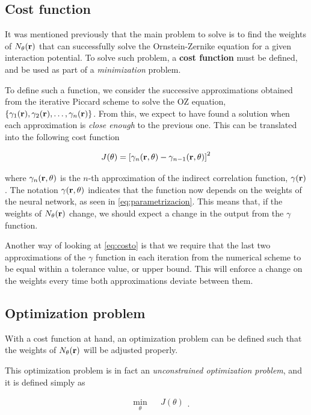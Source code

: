 \subsection{Cost function}
It was mentioned previously that the main problem to solve is to find the weights of
$N_{\theta}(\mathbf{r})$ that can successfully solve the Ornstein-Zernike equation
for a given interaction potential.
To solve such problem, a \textbf{cost function} must be defined, and be used as part of
a \emph{minimization} problem.

To define such a function, we consider the successive approximations obtained from the
iterative Piccard scheme to solve the OZ equation, $\{\gamma_1(\mathbf{r}), \gamma_2(\mathbf{r}), \dots, \gamma_n(\mathbf{r})\}$.
From this, we expect to have found a solution when each approximation
is \emph{close enough} to the previous one. This can be translated into the following
cost function

\begin{equation}
    J(\theta) = \left[\gamma_{n}(\mathbf{r}, \theta) - \gamma_{n-1}(\mathbf{r}, \theta) \right]^2
    \label{eq:costo}
\end{equation}

where $\gamma_{n}(\mathbf{r}, \theta)$ is the $n$-th approximation of the indirect
correlation function, $\gamma(\mathbf{r})$.
The notation $\gamma(\mathbf{r}, \theta)$ indicates that the function now depends
on the weights of the neural network, as seen in \autoref{eq:parametrizacion}.
This means that, if the weights of $N_{\theta}(\mathbf{r})$ change, we should expect a change in the output
from the $\gamma$ function.

Another way of looking at \autoref{eq:costo} is that we require that the last 
two approximations of the $\gamma$ function in each iteration from the numerical scheme to 
be equal within a tolerance value, or upper bound. This will enforce a change on the 
weights every time both approximations deviate between them.

\subsection{Optimization problem}
With a cost function at hand, an optimization problem can be defined such that the
weights of $N_{\theta}(\mathbf{r})$ will be adjusted properly.

This optimization problem is in fact an \emph{unconstrained optimization problem},
and it is defined simply as

\begin{equation}
    \begin{aligned}
         & \underset{\theta}{\text{min}}
         & & J(\theta)
    \end{aligned}
    .
    \label{eq:optimizacion}
\end{equation}


